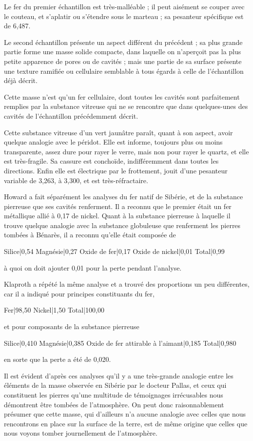 \documentclass[a4paper, 12pt, oneside, french]{article}
\begin{document}
Le fer du premier échantillon est très-malléable ; il peut aisément se couper avec le couteau, et s'aplatir ou s'étendre sous le marteau ; sa pesanteur spécifique est de 6,487.

Le second échantillon présente un aspect différent du précédent ; sa plus grande partie forme une masse solide compacte, dans laquelle on n'aperçoit pas la plus petite apparence de pores ou de cavités ; mais une partie de sa surface présente une texture ramifiée ou cellulaire semblable à tous égards à celle de l'échantillon déjà décrit.

Cette masse n'est qu'un fer cellulaire, dont toutes les cavités sont parfaitement remplies par la substance vitreuse qui ne se rencontre que dans quelques-unes des cavités de l'échantillon précédemment décrit.

Cette substance vitreuse d'un vert jaunâtre paraît, quant à son aspect, avoir quelque analogie avec le péridot. Elle est informe, toujours plus ou moins transparente, assez dure pour rayer le verre, mais non pour rayer le quartz, et elle est très-fragile. Sa cassure est conchoïde, indifféremment dans toutes les directions. Enfin elle est électrique par le frottement, jouit d'une pesanteur variable de 3,263, à 3,300, et est très-réfractaire.

Howard a fait séparément les analyses du fer natif de Sibérie, et de la substance pierreuse que ses cavités renferment. Il a reconnu que le premier était un fer métallique allié à 0,17 de nickel. Quant à la substance pierreuse à laquelle il trouve quelque analogie avec la substance globuleuse que renferment les pierres tombées à Bénarès, il a reconnu qu'elle était composée de

Silice|0,54  
Magnésie|0,27  
Oxide de fer|0,17  
Oxide de nickel|0,01  
Total|0,99

à quoi on doit ajouter 0,01 pour la perte pendant l'analyse.

Klaproth a répété la même analyse et a trouvé des proportions un peu différentes, car il a indiqué pour principes constituants du fer,

Fer|98,50  
Nickel|1,50  
Total|100,00

et pour composants de la substance pierreuse

Silice|0,410  
Magnésie|0,385  
Oxide de fer attirable à l'aimant|0,185  
Total|0,980

en sorte que la perte a été de 0,020.

Il est évident d'après ces analyses qu'il y a une très-grande analogie entre les éléments de la masse observée en Sibérie par le docteur Pallas, et ceux qui constituent les pierres qu'une multitude de témoignages irrécusables nous démontrent être tombées de l'atmosphère. On peut donc raisonnablement présumer que cette masse, qui d'ailleurs n'a aucune analogie avec celles que nous rencontrons en place sur la surface de la terre, est de même origine que celles que nous voyons tomber journellement de l'atmosphère.
\end{document}
